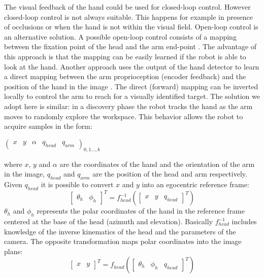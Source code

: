 The visual feedback of the hand could be used for closed-loop control.
However closed-loop control is not always suitable. This happens for example
in presence of occlusions or when the hand is not within the visual field.
%
Open-loop control is an alternative solution. A possible open-loop
control consists of a mapping between the fixation point of the
head and the arm end-point \cite{metta00Babybot}. The advantage of
this approach is that the mapping can be easily learned if the
robot is able to look at the hand. Another approach uses the output of the 
hand detector to learn a direct mapping between the arm
proprioception (encoder feedback) and the position of the hand in
the image \cite{natale05from}. The direct (forward) mapping
can be inverted locally to control the arm to reach for a visually
identified target. The solution we adopt here is similar: in a
discovery phase the robot tracks the hand as the arm moves to
randomly explore the workspace. This behavior allows the robot to
acquire samples in the form:
%
\begin{center}
\begin{math}
  \left(\begin{array}{ccccc}
    x & y & \alpha &q_{head} &q_{arm} \end{array}\right)_{0,1\dots,k}
\end{math}
\end{center}
%
where $x$, $y$ and $\alpha$ are the coordinates of the hand and the 
orientation of the arm in the image, $q_{head}$ and $q_{arm}$ are
the position of the head and arm respectively. Given $q_{head}$ it is
possible to convert $x$ and $y$ into an egocentric reference frame:
%
\begin{equation}
  \left[
  \begin{array}{ccc}
    \theta_h & \phi_h
    \end{array}\right]^T
  = f_{head}^{-1}
  \left(\left[\begin{array}{ccc}
    x &
    y &
    q_{head}
    \end{array}\right]^T \right)
\label{eq-head-inverse}
\end{equation}
%
$\theta_h$ and $\phi_h$ represents the polar coordinates of the hand in the
reference frame centered at the base of the head (azimuth and elevation). 
Basically $f_{head}^{-1}$ includes knowledge of the inverse kinematics of the
head and the parameters of the camera. The opposite transformation maps
polar coordinates into the image plane:
\begin{equation}
  \left[\begin{array}{cc}
    x & y
    \end{array}\right]^T
  = f_{head}
  \left(\left[\begin{array}{ccc}
    \theta_h &
    \phi_h &
    q_{head}
    \end{array} \right]^T\right)
\label{eq-head-direct}
\end{equation}

